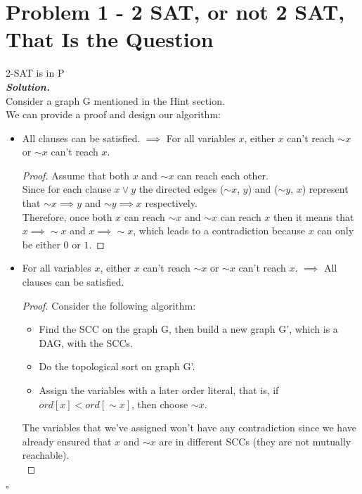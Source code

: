 \documentclass[12pt, a4paper, UTF8]{article}
\newenvironment{solution}[1][\it{Solution}]{\textbf{#1. }\\}{\begin{flushright}$\square$\end{flushright}}
\begin{document}
\section*{Problem 1 - 2 SAT, or not 2 SAT, That Is the Question}
\begin{subprobs}
\item{2-SAT is in P}\\
    \begin{solution}
        Consider a graph G mentioned in the Hint section.\\
        We can provide a proof and design our algorithm:
        \begin{itemize}
        \item All clauses can be satisfied. $\implies$ For all variables $x$, either $x$ can't reach $\sim{}x$ or $\sim{}x$ can't reach $x$.
        \begin{proof}
            Assume that both $x$ and $\sim{}x$ can reach each other.\\
            Since for each clause $x \vee y$ the directed edges ($\sim{}x$, $y$) and ($\sim{}y$, $x$) represent that $\sim{}x \implies y $ and $\sim{}y \implies x$ respectively.\\
            Therefore, once both $x$ can reach $\sim{}x$ and $\sim{}x$ can reach $x$ then it means that $x \implies \sim{}x$ and $x \implies \sim{}x$, which leads to a contradiction because $x$ can only be either $0$ or $1$.
        \end{proof}
        \item For all variables $x$, either $x$ can't reach $\sim{}x$ or $\sim{}x$ can't reach $x$. $\implies$ All clauses can be satisfied.
        \begin{proof}
            Consider the following algorithm:
            \begin{itemize}
                \item Find the SCC on the graph G, then build a new graph G', which is a DAG, with the SCCs.
                \item Do the topological sort on graph G'.
                \item Assign the variables with a later order literal, that is, if $ord[x] < ord[\sim{}x]$, then choose $\sim{}x$.
            \end{itemize}
            The variables that we've assigned won't have any contradiction since we have already ensured that $x$ and $\sim{}x$ are in different SCCs (they are not mutually reachable). \\                     

\end{proof}
\end{itemize}
\end{solution}
\end{subprobs}
\end{document}
